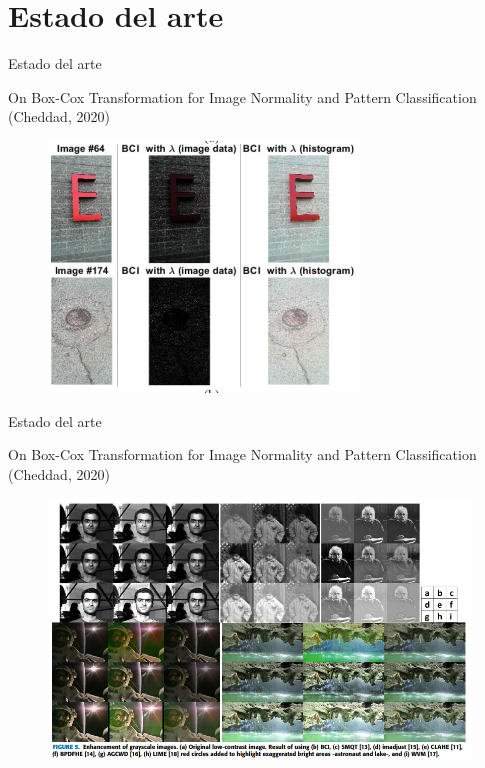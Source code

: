 \documentclass{beamer}
\begin{document}
\section{Estado del arte}
\begin{frame}{Estado del arte}
    \pause
    \begin{block}{On Box-Cox Transformation for Image Normality and Pattern Classification (Cheddad, 2020) \cite{cheddad2020}}
        \begin{figure}
            \centering
            \includegraphics[scale=0.7] {paperbcim2.png}
            \label{fig:my_label}
        \end{figure}
    \end{block}    
\end{frame}
\begin{frame}{Estado del arte}
    \begin{block}{On Box-Cox Transformation for Image Normality and Pattern Classification (Cheddad, 2020) \cite{cheddad2020}}
        \begin{figure}
            \centering
            \includegraphics[scale=0.4] {paperbcim1.png}
            \label{fig:my_label}
        \end{figure}
    \end{block}    
\end{frame}
\end{document}
